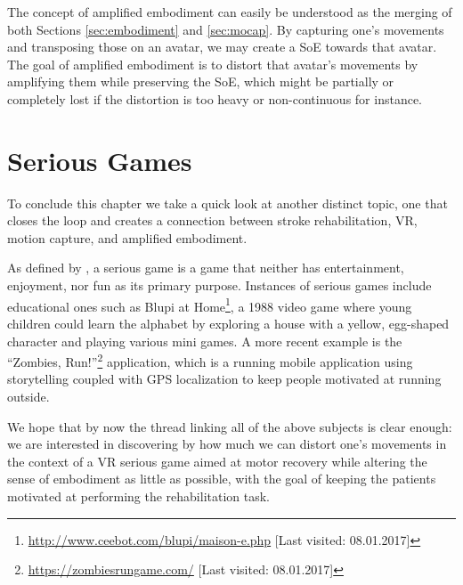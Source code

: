 The concept of amplified embodiment can easily be understood as the merging of both Sections \ref{sec:embodiment} and \ref{sec:mocap}. By capturing one's movements and transposing those on an avatar, we may create a SoE towards that avatar. The goal of amplified embodiment is to distort that avatar's movements by amplifying them while preserving the SoE, which might be partially or completely lost if the distortion is too heavy or non-continuous for instance.

\section{Serious Games}

To conclude this chapter we take a quick look at another distinct topic, one that closes the loop and creates a connection between stroke rehabilitation, VR, motion capture, and amplified embodiment.

As defined by \cite{djaouti2011classifying,chen2005proof}, a serious game is a game that neither has entertainment, enjoyment, nor fun as its primary purpose. Instances of serious games include educational ones such as Blupi at Home\footnote{\url{http://www.ceebot.com/blupi/maison-e.php} [Last visited: 08.01.2017]}, a 1988 video game where young children could learn the alphabet by exploring a house with a yellow, egg-shaped character and playing various mini games. A more recent example is the ``Zombies, Run!''\footnote{\url{https://zombiesrungame.com/} [Last visited: 08.01.2017]} application, which is a running mobile application using storytelling coupled with GPS localization to keep people motivated at running outside.

We hope that by now the thread linking all of the above subjects is clear enough: we are interested in discovering by how much we can distort one's movements in the context of a VR serious game aimed at motor recovery while altering the sense of embodiment as little as possible, with the goal of keeping the patients motivated at performing the rehabilitation task.
